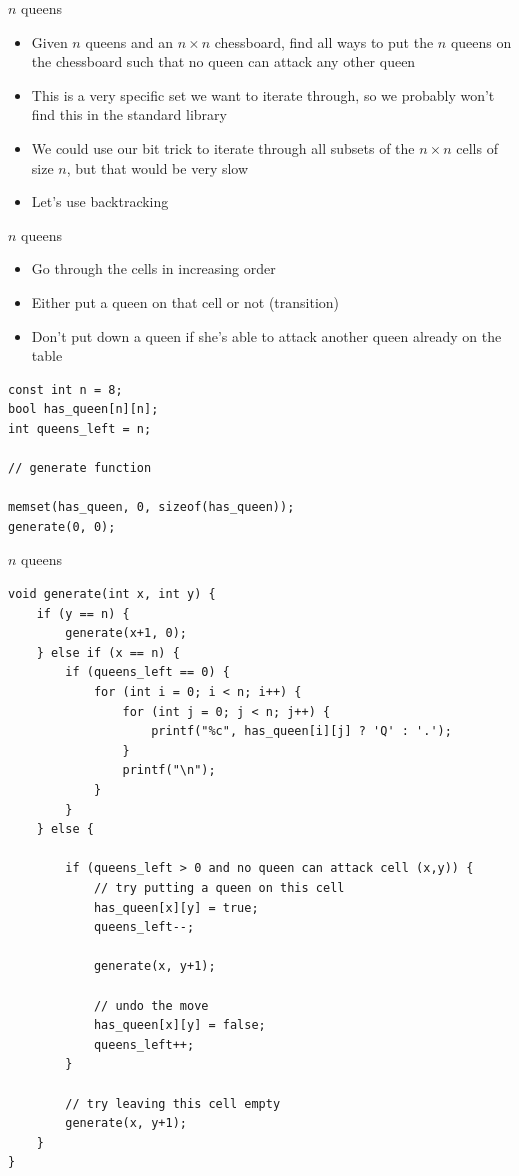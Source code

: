 \documentclass[10pt]{beamer}
\newcommand{\bi}{\begin{itemize}}
\newcommand{\ei}{\end{itemize}}
\begin{document}
\begin{frame}[fragile]{$n$ queens}
    \bi
        \item Given $n$ queens and an $n\times n$ chessboard, find all ways to
            put the $n$ queens on the chessboard such that no queen can attack
            any other queen

        \vspace{10pt}

        \item This is a very specific set we want to iterate through, so we probably won't find this in the standard library
        \item We could use our bit trick to iterate through all subsets of the $n\times n$ cells of size $n$, but that would be very slow
        \vspace{20pt}
        \item Let's use backtracking
    \ei
\end{frame}

\begin{frame}[fragile]{$n$ queens}
    \bi
        \item Go through the cells in increasing order
        \item Either put a queen on that cell or not (transition)
        \item Don't put down a queen if she's able to attack another queen already on the table
    \ei

    \vspace{10pt}

    \begin{verbatim}
const int n = 8;
bool has_queen[n][n];
int queens_left = n;

// generate function

memset(has_queen, 0, sizeof(has_queen));
generate(0, 0);
    \end{verbatim}
\end{frame}

\begin{frame}[fragile]{$n$ queens}
    \begin{verbatim}
void generate(int x, int y) {
    if (y == n) {
        generate(x+1, 0);
    } else if (x == n) {
        if (queens_left == 0) {
            for (int i = 0; i < n; i++) {
                for (int j = 0; j < n; j++) {
                    printf("%c", has_queen[i][j] ? 'Q' : '.');
                }
                printf("\n");
            }
        }
    } else {

        if (queens_left > 0 and no queen can attack cell (x,y)) {
            // try putting a queen on this cell
            has_queen[x][y] = true;
            queens_left--;

            generate(x, y+1);

            // undo the move
            has_queen[x][y] = false;
            queens_left++;
        }

        // try leaving this cell empty
        generate(x, y+1);
    }
}
    \end{verbatim}
\end{frame}
\end{document}
